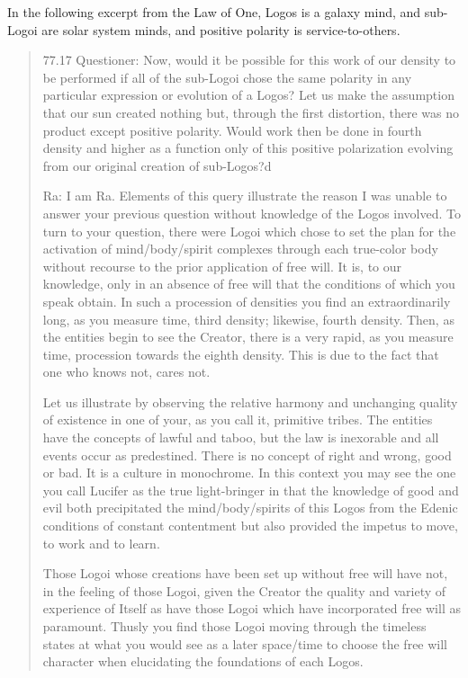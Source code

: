 \documentclass{report}
\begin{document}
In the following excerpt from the Law of One, Logos is a galaxy mind, and
sub-Logoi are solar system minds, and positive polarity is service-to-others.

\blockquote{77.17 Questioner: Now, would it be possible for this work of our
density to be performed if all of the sub-Logoi chose the same polarity in any
particular expression or evolution of a Logos? Let us make the assumption that
our sun created nothing but, through the first distortion, there was no product
except positive polarity. Would work then be done in fourth density and higher
as a function only of this positive polarization evolving from our original
creation of sub-Logos?d

Ra: I am Ra. Elements of this query illustrate the reason I was unable to answer
your previous question without knowledge of the Logos involved. To turn to your
question, there were Logoi which chose to set the plan for the activation of
mind/body/spirit complexes through each true-color body without recourse to the
prior application of free will. It is, to our knowledge, only in an absence of
free will that the conditions of which you speak obtain. In such a procession of
densities you find an extraordinarily long, as you measure time, third density;
likewise, fourth density. Then, as the entities begin to see the Creator, there
is a very rapid, as you measure time, procession towards the eighth density.
This is due to the fact that one who knows not, cares not.

Let us illustrate by observing the relative harmony and unchanging quality of
existence in one of your, as you call it, primitive tribes. The entities have
the concepts of lawful and taboo, but the law is inexorable and all events occur
as predestined. There is no concept of right and wrong, good or bad. It is a
culture in monochrome. In this context you may see the one you call Lucifer as
the true light-bringer in that the knowledge of good and evil both precipitated
the mind/body/spirits of this Logos from the Edenic conditions of constant
contentment but also provided the impetus to move, to work and to learn.

Those Logoi whose creations have been set up without free will have not, in the
feeling of those Logoi, given the Creator the quality and variety of experience
of Itself as have those Logoi which have incorporated free will as paramount.
Thusly you find those Logoi moving through the timeless states at what you would
see as a later space/time to choose the free will character when elucidating the
foundations of each Logos.

}
\end{document}
